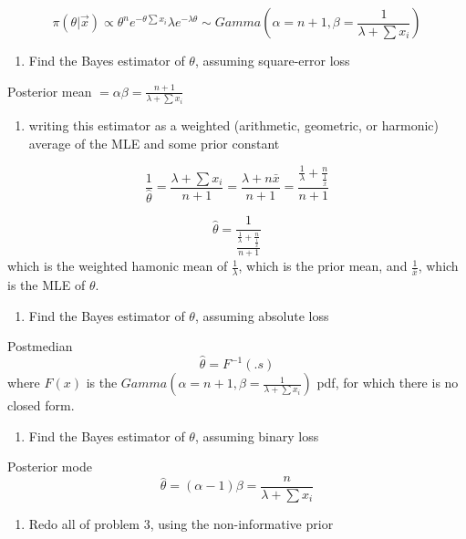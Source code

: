 \documentclass[]{article}
\providecommand{\tightlist}{%
  \setlength{\itemsep}{0pt}\setlength{\parskip}{0pt}}
\begin{document}
\[\pi(\theta|\vec x)\propto \theta^n e^{-\theta\sum x_i}\lambda e^{-\lambda\theta}\sim Gamma(\alpha=n+1,\beta=\frac1{\lambda+\sum x_i})\]

\begin{enumerate}
\def\labelenumi{\alph{enumi}.}
\setcounter{enumi}{1}
\tightlist
\item
  \textcolor[rgb]{0.5,0.5,0.5}{Find the Bayes estimator of $\theta$, assuming square-error loss}
\end{enumerate}

Posterior mean \(=\alpha\beta=\frac{n+1}{\lambda+\sum x_i}\)

\begin{enumerate}
\def\labelenumi{\alph{enumi}.}
\setcounter{enumi}{2}
\tightlist
\item
  \textcolor[rgb]{0.5,0.5,0.5}{writing this estimator as a weighted (arithmetic, geometric, or harmonic) average of the MLE and some prior constant}
\end{enumerate}

\[\frac1{\hat\theta}=\frac{\lambda+\sum x_i}{n+1}=\frac{\lambda+n\bar x}{n+1}=\frac{\frac1\lambda+\frac{n}{\frac1{\bar x}}}{n+1}\]

\[\hat\theta=\frac1{\frac{\frac1\lambda+\frac{n}{\frac1{\bar x}}}{n+1}}\]
which is the weighted hamonic mean of \(\frac1{\lambda}\), which is the
prior mean, and \(\frac1{\bar x}\), which is the MLE of \(\theta\).

\begin{enumerate}
\def\labelenumi{\alph{enumi}.}
\setcounter{enumi}{3}
\tightlist
\item
  \textcolor[rgb]{0.5,0.5,0.5}{Find the Bayes estimator of $\theta$, assuming absolute loss}
\end{enumerate}

Postmedian \[\hat\theta=F^{-1}(.s)\] where \(F(x)\) is the
\(Gamma(\alpha=n+1,\beta=\frac1{\lambda+\sum x_i})\) pdf, for which
there is no closed form.

\begin{enumerate}
\def\labelenumi{\alph{enumi}.}
\setcounter{enumi}{4}
\tightlist
\item
  \textcolor[rgb]{0.5,0.5,0.5}{Find the Bayes estimator of $\theta$, assuming binary loss}
\end{enumerate}

Posterior mode \[\hat\theta=(\alpha-1)\beta=\frac{n}{\lambda+\sum x_i}\]

\begin{enumerate}
\def\labelenumi{\arabic{enumi}.}
\setcounter{enumi}{3}
\tightlist
\item
  \textcolor[rgb]{0.5,0.5,0.5}{Redo all of problem 3, using the non-informative prior}
\end{enumerate}
\end{document}
